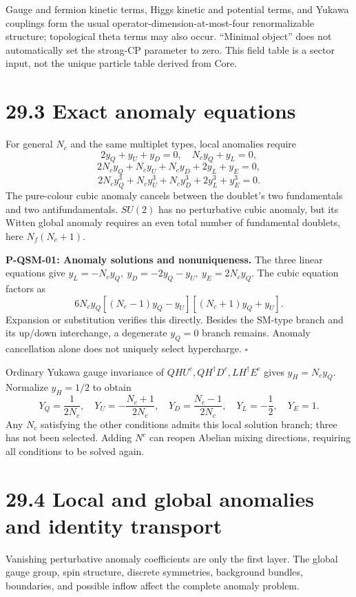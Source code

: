 \documentclass[
  11pt,
  oneside]{book}
\begin{document}
Gauge and fermion kinetic terms, Higgs kinetic and potential terms, and
Yukawa couplings form the usual operator-dimension-at-most-four
renormalizable structure; topological theta terms may also occur.
``Minimal object'' does not automatically set the strong-CP parameter to
zero. This field table is a sector input, not the unique particle table
derived from Core.

\section{29.3 Exact anomaly equations}

For general \(N_c\) and the same multiplet types, local anomalies
require \[
2y_Q+y_U+y_D=0,\quad N_cy_Q+y_L=0,
\] \[
2N_cy_Q+N_cy_U+N_cy_D+2y_L+y_E=0,
\] \[
2N_cy_Q^3+N_cy_U^3+N_cy_D^3+2y_L^3+y_E^3=0.
\] The pure-colour cubic anomaly cancels between the doublet's two
fundamentals and two antifundamentals. \(SU(2)\) has no perturbative
cubic anomaly, but its Witten global anomaly requires an even total
number of fundamental doublets, here \(N_f(N_c+1)\).

\label{p-qsm-01}{}

\textbf{P-QSM-01: Anomaly solutions and nonuniqueness.} The three linear
equations give \(y_L=-N_cy_Q,\ y_D=-2y_Q-y_U,\ y_E=2N_cy_Q\). The cubic
equation factors as \[
6N_cy_Q[(N_c-1)y_Q-y_U][(N_c+1)y_Q+y_U].
\] Expansion or substitution verifies this directly. Besides the SM-type
branch and its up/down interchange, a degenerate \(y_Q=0\) branch
remains. Anomaly cancellation alone does not uniquely select
hypercharge. \(\square\)

Ordinary Yukawa gauge invariance of
\(QHU^c,QH^\dagger D^c,LH^\dagger E^c\) gives \(y_H=N_cy_Q\). Normalize
\(y_H=1/2\) to obtain \[
Y_Q=\frac1{2N_c},\quad
Y_U=-\frac{N_c+1}{2N_c},\quad
Y_D=\frac{N_c-1}{2N_c},\quad Y_L=-\frac12,\quad Y_E=1.
\] Any \(N_c\) satisfying the other conditions admits this local
solution branch; three has not been selected. Adding \(N^c\) can reopen
Abelian mixing directions, requiring all conditions to be solved again.

\section{29.4 Local and global anomalies and identity transport}

Vanishing perturbative anomaly coefficients are only the first layer.
The global gauge group, spin structure, discrete symmetries, background
bundles, boundaries, and possible inflow affect the complete anomaly
problem.
\end{document}
